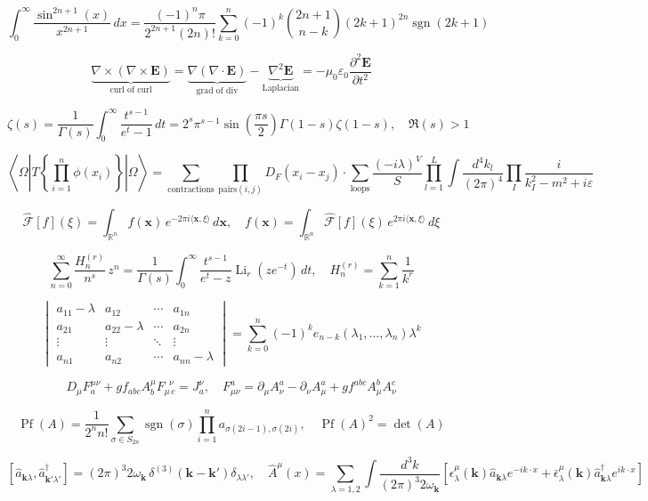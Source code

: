 \documentclass[a4paper,9pt]{article}
\begin{document}
\[
\int_0^\infty\frac{\sin^{2n+1}(x)}{x^{2n+1}}\,dx = \frac{(-1)^n\pi}{2^{2n+1}(2n)!}\sum_{k=0}^{n}(-1)^k\binom{2n+1}{n-k}(2k+1)^{2n}\operatorname{sgn}(2k+1)
\]

\[
\underbrace{\nabla\times(\nabla\times\mathbf{E})}_{\text{curl of curl}} = \underbrace{\nabla(\nabla\cdot\mathbf{E})}_{\text{grad of div}} - \underbrace{\nabla^2\mathbf{E}}_{\text{Laplacian}} = -\mu_0\varepsilon_0\frac{\partial^2\mathbf{E}}{\partial t^2}
\]

\[
\zeta(s) = \frac{1}{\Gamma(s)}\int_0^\infty\frac{t^{s-1}}{e^t-1}\,dt = 2^s\pi^{s-1}\sin\!\left(\frac{\pi s}{2}\right)\Gamma(1-s)\zeta(1-s),\quad\Re(s)>1
\]

\[
\left\langle\Omega\left|T\left\{\prod_{i=1}^{n}\phi(x_i)\right\}\right|\Omega\right\rangle = \sum_{\text{contractions}}\prod_{\text{pairs}(i,j)}D_F(x_i-x_j)\cdot\sum_{\text{loops}}\frac{(-i\lambda)^V}{S}\prod_{l=1}^{L}\int\frac{d^4k_l}{(2\pi)^4}\prod_{I}\frac{i}{k_I^2-m^2+i\varepsilon}
\]

\[
\widehat{\mathcal{F}}[f](\xi) = \int_{\mathbb{R}^n}f(\mathbf{x})\,e^{-2\pi i\langle\mathbf{x},\xi\rangle}\,d\mathbf{x},\quad f(\mathbf{x}) = \int_{\mathbb{R}^n}\widehat{\mathcal{F}}[f](\xi)\,e^{2\pi i\langle\mathbf{x},\xi\rangle}\,d\xi
\]

\[
\sum_{n=0}^{\infty}\frac{H_n^{(r)}}{n^s}\,z^n = \frac{1}{\Gamma(s)}\int_0^\infty\frac{t^{s-1}}{e^t-z}\operatorname{Li}_r(ze^{-t})\,dt,\quad H_n^{(r)}=\sum_{k=1}^{n}\frac{1}{k^r}
\]

\[
\begin{vmatrix}a_{11}-\lambda & a_{12} & \cdots & a_{1n}\\a_{21} & a_{22}-\lambda & \cdots & a_{2n}\\\vdots & \vdots & \ddots & \vdots\\a_{n1} & a_{n2} & \cdots & a_{nn}-\lambda\end{vmatrix} = \sum_{k=0}^{n}(-1)^k e_{n-k}(\lambda_1,\ldots,\lambda_n)\lambda^k
\]

\[
D_{\mu}F^{\mu\nu}_a + g f_{abc}A^{\mu}_b F_{\mu\,c}^{\;\;\nu} = J^{\nu}_a,\quad F_{\mu\nu}^a = \partial_\mu A_\nu^a - \partial_\nu A_\mu^a + g f^{abc}A_\mu^b A_\nu^c
\]

\[
\operatorname{Pf}(A) = \frac{1}{2^n n!}\sum_{\sigma\in S_{2n}}\operatorname{sgn}(\sigma)\prod_{i=1}^{n}a_{\sigma(2i-1),\sigma(2i)},\quad\operatorname{Pf}(A)^2 = \det(A)
\]

\[
\left[\hat{a}_{\mathbf{k}\lambda},\hat{a}_{\mathbf{k}'\lambda'}^{\dagger}\right] = (2\pi)^3 2\omega_{\mathbf{k}}\,\delta^{(3)}(\mathbf{k}-\mathbf{k}')\delta_{\lambda\lambda'},\quad \hat{A}^{\mu}(x)=\sum_{\lambda=1,2}\int\frac{d^3k}{(2\pi)^3 2\omega_{\mathbf{k}}}\left[\epsilon^{\mu}_\lambda(\mathbf{k})\hat{a}_{\mathbf{k}\lambda}e^{-ik\cdot x}+\bar{\epsilon}^{\mu}_\lambda(\mathbf{k})\hat{a}_{\mathbf{k}\lambda}^{\dagger}e^{ik\cdot x}\right]
\]
\end{document}
